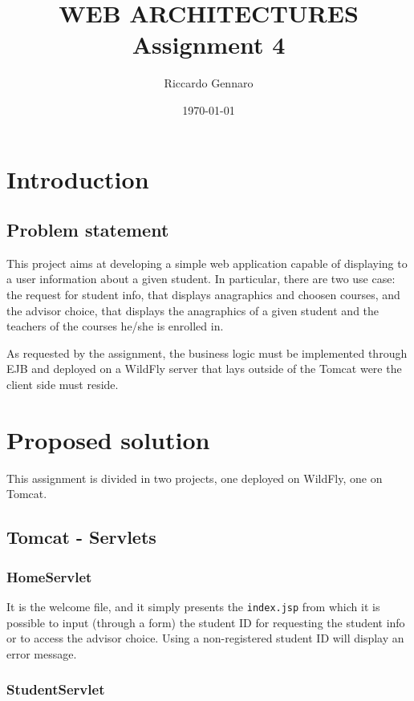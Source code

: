 \documentclass{article}
\title{WEB ARCHITECTURES \\Assignment 4}
\author{Riccardo Gennaro}
\date{\today}
\begin{document}
\maketitle

\section{Introduction}

\subsection*{Problem statement}

This project aims at developing a simple web application capable of displaying to a user information about a given student. In particular, there are two use case: the request for student info, that displays anagraphics and choosen courses, and the advisor choice, that displays the anagraphics of a given student and the teachers of the courses he/she is enrolled in.

As requested by the assignment, the business logic must be implemented through EJB and deployed on a WildFly server that lays outside of the Tomcat were the client side must reside.

\section{Proposed solution}

This assignment is divided in two projects, one deployed on WildFly, one on Tomcat.

\subsection*{Tomcat - Servlets}

\subsubsection*{HomeServlet}

It is the welcome file, and it simply presents the \texttt{index.jsp} from which it is possible to input (through a form) the student ID for requesting the student info or to access the advisor choice. Using a non-registered student ID will display an error message.

\subsubsection*{StudentServlet}
\end{document}
